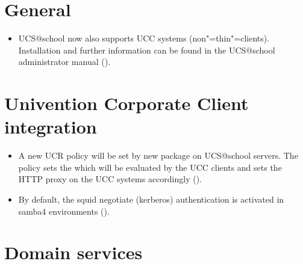 \section{General}
\begin{itemize}
\item UCS@school now also supports UCC systems (non"=thin"=clients). Installation and further information can
  be found in the UCS@school administrator manual ().
\end{itemize}

 

\section{Univention Corporate Client integration}
\begin{itemize}
\item A new UCR policy will be set by new package  on UCS@school
  servers. The policy sets the  which will be evaluated by the UCC clients and sets
  the HTTP proxy on the UCC systems accordingly ().
\item By default, the squid negotiate (kerberos) authentication is activated
      in samba4 environments ().
\end{itemize}

\section{Domain services}

